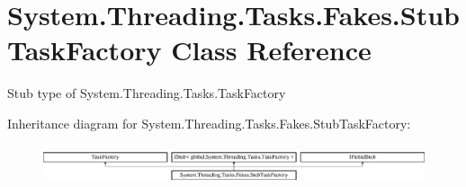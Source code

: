 \hypertarget{class_system_1_1_threading_1_1_tasks_1_1_fakes_1_1_stub_task_factory}{\section{System.\-Threading.\-Tasks.\-Fakes.\-Stub\-Task\-Factory Class Reference}
\label{class_system_1_1_threading_1_1_tasks_1_1_fakes_1_1_stub_task_factory}
}


Stub type of System.\-Threading.\-Tasks.\-Task\-Factory 


Inheritance diagram for System.\-Threading.\-Tasks.\-Fakes.\-Stub\-Task\-Factory\-:\begin{figure}[H]
\begin{center}
\leavevmode
\includegraphics[height=1.163032cm]{class_system_1_1_threading_1_1_tasks_1_1_fakes_1_1_stub_task_factory}
\end{center}
\end{figure}
